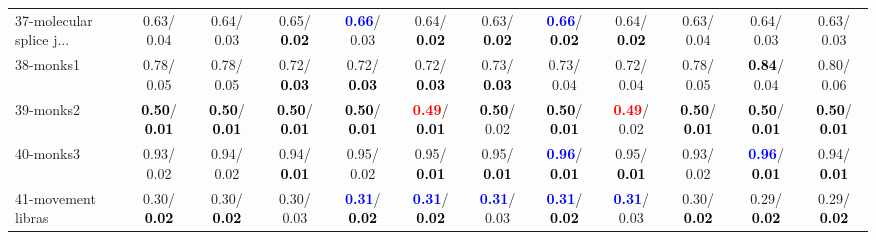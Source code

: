 \begin{table}[h]
\begin{center}
{\begin{tabular}{lc|c|c|c|c|c|c|c|c|c|c}
37-molecular splice j... &   0.63/  0.04 &   0.64/  0.03 &   0.65/\textcolor{black}{\textbf{  0.02}} & \textcolor{blue}{\textbf{  0.66}}/  0.03 &   0.64/\textcolor{black}{\textbf{  0.02}} &   0.63/\textcolor{black}{\textbf{  0.02}} & \textcolor{blue}{\textbf{  0.66}}/\textcolor{black}{\textbf{  0.02}} &   0.64/\textcolor{black}{\textbf{  0.02}} &   0.63/  0.04 &   0.64/  0.03 &   0.63/  0.03 \\
38-monks1 &   0.78/  0.05 &   0.78/  0.05 &   0.72/\textcolor{black}{\textbf{  0.03}} &   0.72/\textcolor{black}{\textbf{  0.03}} &   0.72/\textcolor{black}{\textbf{  0.03}} &   0.73/\textcolor{black}{\textbf{  0.03}} &   0.73/  0.04 &   0.72/  0.04 &   0.78/  0.05 & \textcolor{black}{\textbf{  0.84}}/  0.04 &   0.80/  0.06 \\
39-monks2 & \textcolor{black}{\textbf{  0.50}}/\textcolor{black}{\textbf{  0.01}} & \textcolor{black}{\textbf{  0.50}}/\textcolor{black}{\textbf{  0.01}} & \textcolor{black}{\textbf{  0.50}}/\textcolor{black}{\textbf{  0.01}} & \textcolor{black}{\textbf{  0.50}}/\textcolor{black}{\textbf{  0.01}} & \textcolor{red}{\textbf{  0.49}}/\textcolor{black}{\textbf{  0.01}} & \textcolor{black}{\textbf{  0.50}}/  0.02 & \textcolor{black}{\textbf{  0.50}}/\textcolor{black}{\textbf{  0.01}} & \textcolor{red}{\textbf{  0.49}}/  0.02 & \textcolor{black}{\textbf{  0.50}}/\textcolor{black}{\textbf{  0.01}} & \textcolor{black}{\textbf{  0.50}}/\textcolor{black}{\textbf{  0.01}} & \textcolor{black}{\textbf{  0.50}}/\textcolor{black}{\textbf{  0.01}} \\ \hline
40-monks3 &   0.93/  0.02 &   0.94/  0.02 &   0.94/\textcolor{black}{\textbf{  0.01}} &   0.95/  0.02 &   0.95/\textcolor{black}{\textbf{  0.01}} &   0.95/\textcolor{black}{\textbf{  0.01}} & \textcolor{blue}{\textbf{  0.96}}/\textcolor{black}{\textbf{  0.01}} &   0.95/\textcolor{black}{\textbf{  0.01}} &   0.93/  0.02 & \textcolor{blue}{\textbf{  0.96}}/\textcolor{black}{\textbf{  0.01}} &   0.94/\textcolor{black}{\textbf{  0.01}} \\
41-movement libras &   0.30/\textcolor{black}{\textbf{  0.02}} &   0.30/\textcolor{black}{\textbf{  0.02}} &   0.30/  0.03 & \textcolor{blue}{\textbf{  0.31}}/\textcolor{black}{\textbf{  0.02}} & \textcolor{blue}{\textbf{  0.31}}/\textcolor{black}{\textbf{  0.02}} & \textcolor{blue}{\textbf{  0.31}}/  0.03 & \textcolor{blue}{\textbf{  0.31}}/\textcolor{black}{\textbf{  0.02}} & \textcolor{blue}{\textbf{  0.31}}/  0.03 &   0.30/\textcolor{black}{\textbf{  0.02}} &   0.29/\textcolor{black}{\textbf{  0.02}} &   0.29/\textcolor{black}{\textbf{  0.02}} \\

\end{tabular}}
\end{center}
\end{table}
